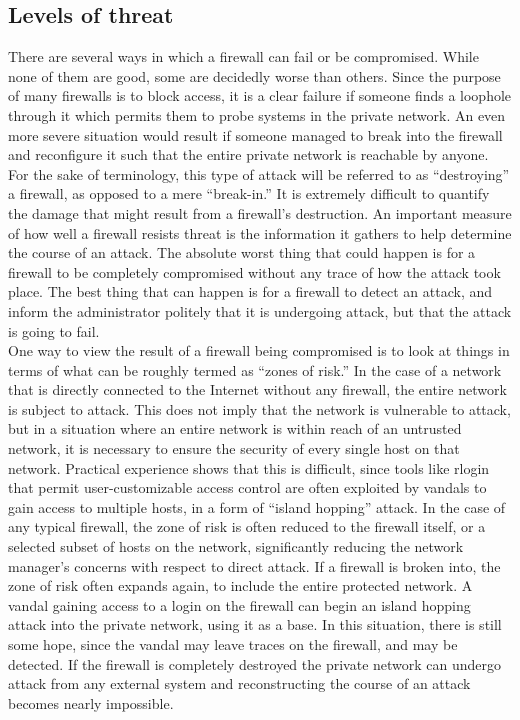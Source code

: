 \subsection{Levels of threat}
There are several ways in which a firewall can fail or be compromised.
While none of them are good, some are decidedly worse than others.
Since the purpose of many firewalls is to block access, it is a clear
failure if someone finds a loophole through it which permits them to
probe systems in the private network. An even more severe situation
would result if someone managed to break into the firewall and
reconfigure it such that the entire private network is reachable by
anyone. For the sake of terminology, this type of attack will be
referred to as ``destroying'' a firewall, as opposed to a mere
``break-in.'' It is extremely difficult to quantify the damage that
might result from a firewall's destruction. An important measure of how
well a firewall resists threat is the information it gathers to help
determine the course of an attack. The absolute worst thing that could
happen is for a firewall to be completely compromised without any trace
of how the attack took place. The best thing that can happen is for a
firewall to detect an attack, and inform the administrator politely
that it is undergoing attack, but that the attack is going to fail.\\

One way to view the result of a firewall being compromised is to look
at things in terms of what can be roughly termed as ``zones of risk.''
In the case of a network that is directly connected to the Internet
without any firewall, the entire network is subject to attack. This
does not imply that the network is vulnerable to attack, but in a
situation where an entire network is within reach of an untrusted
network, it is necessary to ensure the security of every single host on
that network. Practical experience shows that this is difficult, since
tools like rlogin that permit user-customizable access control are
often exploited by vandals to gain access to multiple hosts, in a form
of ``island hopping'' attack. In the case of any typical firewall, the
zone of risk is often reduced to the firewall itself, or a selected
subset of hosts on the network, significantly reducing the network
manager's concerns with respect to direct attack. If a firewall is
broken into, the zone of risk often expands again, to include the
entire protected network. A vandal gaining access to a login on the
firewall can begin an island hopping attack into the private network,
using it as a base. In this situation, there is still some hope, since
the vandal may leave traces on the firewall, and may be detected. If
the firewall is completely destroyed the private network can undergo
attack from any external system and reconstructing the course of an
attack becomes nearly impossible.\\


